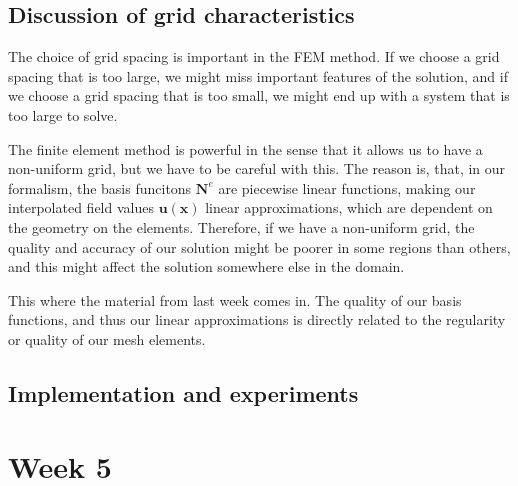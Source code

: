 \documentclass[acmtog]{acmart}
\begin{document}
\subsection{Discussion of grid characteristics}
The choice of grid spacing is important in the FEM method. If we choose a grid
spacing that is too large, we might miss important features of the solution,
and if we choose a grid spacing that is too small, we might end up with a
system that is too large to solve.

The finite element method is powerful in the sense that it allows us to have a
non-uniform grid, but we have to be careful with this. The reason is, that, in
our formalism, the basis funcitons $\boldsymbol N^e$ are piecewise linear
functions, making our interpolated field values $\boldsymbol u(\boldsymbol x)$
linear approximations, which are dependent on the geometry on the elements.
Therefore, if we have a non-uniform grid, the quality and accuracy of our
solution might be poorer in some regions than others, and this might affect the
solution somewhere else in the domain.

This where the material from last week comes in. The quality of our basis
functions, and thus our linear approximations is directly related to the
regularity or quality of our mesh elements.

\subsection{Implementation and experiments}

\newpage
\section{Week 5}
\end{document}
